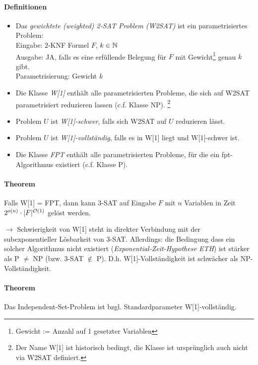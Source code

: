 \paragraph{Definitionen}
\begin{itemize}
    \item Das \emph{gewichtete (weighted) 2-SAT Problem (W2SAT)} ist ein parametrisiertes Problem: \\
    Eingabe: 2-KNF Formel $F$, $k \in \mathbb{N}$ \\
    Ausgabe: JA, falls es eine erfüllende Belegung für $F$ mit Gewicht\footnote{Gewicht := Anzahl auf
    1 gesetzter Variablen} genau $k$ gibt. \\
    Parametrisierung: Gewicht $k$
    \item Die Klasse \emph{W[1]} enthält alle parametrisierten Probleme, die sich auf W2SAT parametrisiert
    reduzieren lassen (c.f. Klasse NP).%
    \footnote{Der Name W[1] ist historisch bedingt, die Klasse ist ursprünglich auch nicht via W2SAT definiert.}
    \item Problem $U$ ist \emph{W[1]-schwer}, falls sich W2SAT auf $U$ reduzieren lässt.
    \item Problem $U$ ist \emph{W[1]-vollständig}, falls es in W[1] liegt und W[1]-schwer ist.
    \item Die Klasse \emph{FPT} enthält alle parametrisierten Probleme, für die ein fpt-Algorithmus existiert (c.f. Klasse P).
\end{itemize}

\paragraph{Theorem}
Falls W[1] = FPT, dann kann 3-SAT auf Eingabe $F$ mit $n$ Variablen in Zeit $2^{o(n)} \cdot |F|^{\mathcal{O}(1)}$
gelöst werden.

$\longrightarrow$ Schwierigkeit von W[1] steht in direkter Verbindung mit der subexponentieller Lösbarkeit von 3-SAT.
Allerdings: die Bedingung dass ein solcher Algorithmus nicht existiert (\emph{Exponential-Zeit-Hypothese ETH})
ist stärker als P $\neq$ NP (bzw. 3-SAT $\notin$ P).
D.h. W[1]-Vollständigkeit ist schwächer als NP-Vollständigkeit.

\paragraph{Theorem}
Das Independent-Set-Problem ist bzgl. Standardparameter W[1]-vollständig.
